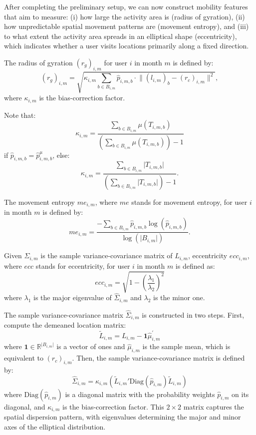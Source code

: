 After completing the preliminary setup, we can now construct mobility features that aim to measure: (i) how large the activity area is (radius of gyration), (ii) how unpredictable spatial movement patterns are (movement entropy), and (iii) to what extent the activity area spreads in an elliptical shape (eccentricity), which indicates whether a user visits locations primarily along a fixed direction.

\begin{definition}
The radius of gyration $(r_g)_{i, m}$ for user $i$ in month $m$ is defined by:
\[
(r_g)_{i, m}
=
\sqrt{
    \kappa_{i, m}
    \sum_{ b \in B_{i, m}}
    \hat{p}_{i, m, b} \cdot \lVert (l_{i, m})_b - (r_c)_{i, m} \rVert^2
},
\]
where $\kappa_{i, m}$ is the bias-correction factor.
\end{definition}


Note that:
\[
\kappa_{i, m}
=
\frac{
\sum_{b \in B_{i, m}}
    \mu(T_{i, m, b})
}{
\left (
    \sum_{b \in B_{i, m}}
        \mu(T_{i, m, b})
\right )
-
1
}
\]
if $\hat{p}_{i, m, b} = \hat{p}^{\mu}_{i, m, b}$, else:
\[
\kappa_{i, m}
=
\frac{
    \sum_{b \in B_{i, m}}
        \lvert T_{i, m, b} \rvert
}{
    \left (
        \sum_{b \in B_{i, m}}
            \lvert T_{i, m, b} \rvert
    \right )
    -
    1
}.
\]

\begin{definition}
The movement entropy $me_{i, m}$, where $me$ stands for movement entropy, for user $i$ in month $m$ is defined by:
\[
me_{i, m}
=
\frac{
- \sum_{b \in B_{i, m}}
    \hat{p}_{i, m, b}
    \log(\hat{p}_{i, m, b})
}{
\log(\lvert B_{i, m} \rvert )
}.
\]
\end{definition}

\clearpage\newpage
\begin{definition}[Eccentricity]
Given $\hat{\Sigma}_{i, m}$ is the sample variance-covariance matrix of $L_{i, m}$, eccentricity $ecc_{i, m}$, where $ecc$ stands for eccentricity, for user $i$ in month $m$ is defined as:
\[
ecc_{i, m}
=
\sqrt{
    1
    -
    \left(
        \frac{\lambda_{1}}{\lambda_{2}}
    \right)^2
}
\]
where $\lambda_{1}$ is the major eigenvalue of $\hat{\Sigma}_{i, m}$ and $\lambda_{2}$ is the minor one.
\end{definition}

The sample variance-covariance matrix $\hat{\Sigma}_{i, m}$ is constructed in two steps.
First, compute the demeaned location matrix:
\[
\tilde{L}_{i, m}
=
L_{i, m}
-
\mathbf{1}\hat{\mu}_{i, m}^{'}
\]
where $\mathbf{1} \in \mathbb{R}^{\lvert B_{i, m} \rvert }$ is a vector of ones and $\hat{\mu}_{i, m}$ is the sample mean, which is equivalent to $(r_c)_{i, m}$.
Then, the sample variance-covariance matrix is defined by:
\[
\hat{\Sigma}_{i, m}
=
\kappa_{i, m} (
    \tilde{L}_{i, m}'
    \text{Diag}(\hat{p}_{i, m})
    \tilde{L}_{i, m}
)
\]
where $\text{Diag}(\hat{p}_{i, m})$ is a diagonal matrix with the probability weights $\hat{p}_{i, m}$ on its diagonal, and $\kappa_{i, m}$ is the bias-correction factor.
This $2\times2$ matrix captures the spatial dispersion pattern, with eigenvalues determining the major and minor axes of the elliptical distribution.

